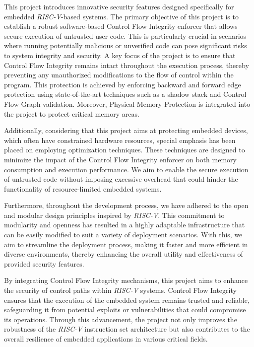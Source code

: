 This project introduces innovative security features designed specifically for embedded
\textit{RISC-V}-based systems. The primary objective of this project is to establish
a robust software-based Control Flow Integrity enforcer that allows secure execution
of untrusted user code. This is particularly crucial in scenarios where running
potentially malicious or unverified code can pose significant risks to system
integrity and security. A key focus of the project is to ensure that Control Flow
Integrity remains intact throughout the execution process, thereby preventing
any unauthorized modifications to the flow of control within the program. This protection
is achieved by enforcing backward and forward edge protection using state-of-the-art
techniques such as a shadow stack and Control Flow Graph validation. Moreover, Physical
Memory Protection is integrated into the project to protect critical memory areas.

Additionally, considering that this project aims at protecting embedded devices,
which often have constrained hardware resources, special emphasis has been
placed on employing optimization techniques. These techniques are designed to minimize
the impact of the Control Flow Integrity enforcer on both memory consumption and
execution performance. We aim to enable the secure execution of untrusted code
without imposing excessive overhead that could hinder the functionality of
resource-limited embedded systems.

Furthermore, throughout the development process, we have adhered to the open and
modular design principles inspired by \textit{RISC-V}. This commitment to
modularity and openness has resulted in a highly adaptable infrastructure that
can be easily modified to suit a variety of deployment scenarios. With this, we
aim to streamline the deployment process, making it faster and more efficient in
diverse environments, thereby enhancing the overall utility and effectiveness of
provided security features.

By integrating Control Flow Integrity mechanisms, this project aims to enhance the
security of control paths within \textit{RISC-V} systems. Control Flow Integrity
ensures that the execution of the embedded system remains trusted and reliable,
safeguarding it from potential exploits or vulnerabilities that could compromise
its operations. Through this advancement, the project not only improves the
robustness of the \textit{RISC-V} instruction set architecture but also contributes
to the overall resilience of embedded applications in various critical fields.

